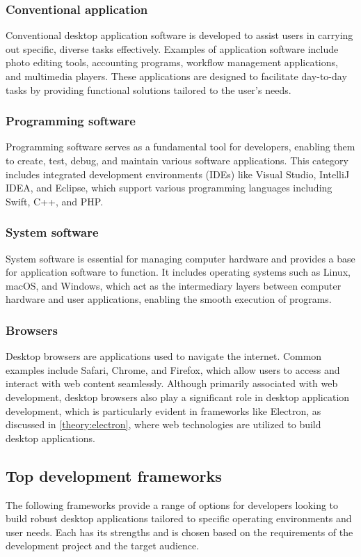 \subsubsection{Conventional application}
Conventional desktop application software is developed to assist users in carrying out specific, diverse tasks effectively. Examples of application software include photo editing tools, accounting programs, workflow management applications, and multimedia players. These applications are designed to facilitate day-to-day tasks by providing functional solutions tailored to the user's needs.

\subsubsection{Programming software}
Programming software serves as a fundamental tool for developers, enabling them to create, test, debug, and maintain various software applications. This category includes integrated development environments (IDEs) like Visual Studio, IntelliJ IDEA, and Eclipse, which support various programming languages including Swift, C++, and PHP.

\subsubsection{System software}
System software is essential for managing computer hardware and provides a base for application software to function. It includes operating systems such as Linux, macOS, and Windows, which act as the intermediary layers between computer hardware and user applications, enabling the smooth execution of programs.

\subsubsection{Browsers}
Desktop browsers are applications used to navigate the internet. Common examples include Safari, Chrome, and Firefox, which allow users to access and interact with web content seamlessly. Although primarily associated with web development, desktop browsers also play a significant role in desktop application development, which is particularly evident in frameworks like Electron, as discussed in \ref{theory:electron}, where web technologies are utilized to build desktop applications.

\subsection{Top development frameworks}
The following frameworks provide a range of options for developers looking to build robust desktop applications tailored to specific operating environments and user needs. Each has its strengths and is chosen based on the requirements of the development project and the target audience.

